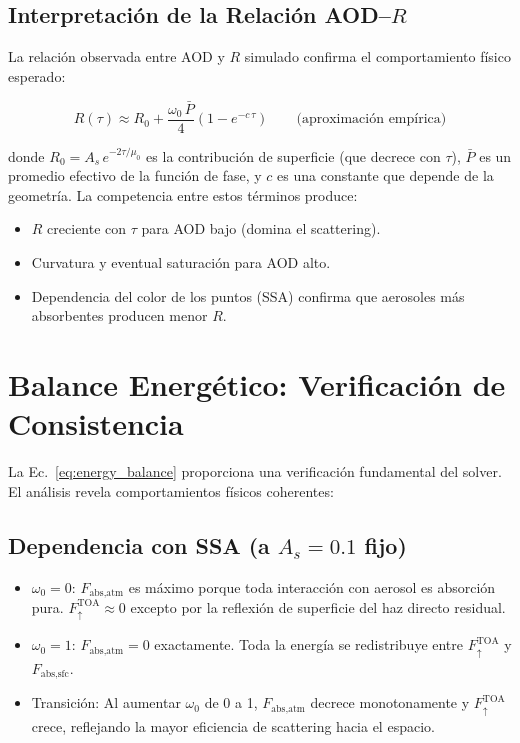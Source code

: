 \documentclass[a4paper,11pt]{article}
\begin{document}
\subsection{Interpretaci\'on de la Relaci\'on AOD--$R$}

La relaci\'on observada entre AOD y $R$ simulado confirma el comportamiento
f\'isico esperado:

\begin{equation}
    R(\tau) \approx R_0 + \frac{\omega_0\,\bar{P}}{4}\left(1 - e^{-c\,\tau}\right)
    \qquad \text{(aproximaci\'on emp\'irica)}
\end{equation}

donde $R_0 = A_s\,e^{-2\tau/\mu_0}$ es la contribuci\'on de superficie (que decrece
con $\tau$), $\bar{P}$ es un promedio efectivo de la funci\'on de fase, y $c$ es una
constante que depende de la geometr\'ia.  La competencia entre estos t\'erminos
produce:
\begin{itemize}
    \item $R$ creciente con $\tau$ para AOD bajo (domina el scattering).
    \item Curvatura y eventual saturaci\'on para AOD alto.
    \item Dependencia del color de los puntos (SSA) confirma que aerosoles
          m\'as absorbentes producen menor $R$.
\end{itemize}


\section{Balance Energ\'etico: Verificaci\'on de Consistencia}
\label{sec:interp_energy}

La Ec.~\eqref{eq:energy_balance} proporciona una verificaci\'on fundamental del
solver.  El an\'alisis revela comportamientos f\'isicos coherentes:

\subsection{Dependencia con SSA (a $A_s = 0.1$ fijo)}

\begin{itemize}
    \item $\omega_0 = 0$: $F_{\text{abs,atm}}$ es m\'aximo porque toda interacci\'on
          con aerosol es absorci\'on pura.  $F_\uparrow^{\text{TOA}} \approx 0$ excepto
          por la reflexi\'on de superficie del haz directo residual.

    \item $\omega_0 = 1$: $F_{\text{abs,atm}} = 0$ exactamente.  Toda la energ\'ia se
          redistribuye entre $F_\uparrow^{\text{TOA}}$ y $F_{\text{abs,sfc}}$.

    \item Transici\'on: Al aumentar $\omega_0$ de 0 a 1, $F_{\text{abs,atm}}$ decrece
          monotonamente y $F_\uparrow^{\text{TOA}}$ crece, reflejando la mayor eficiencia
          de scattering hacia el espacio.
\end{itemize}
\end{document}
